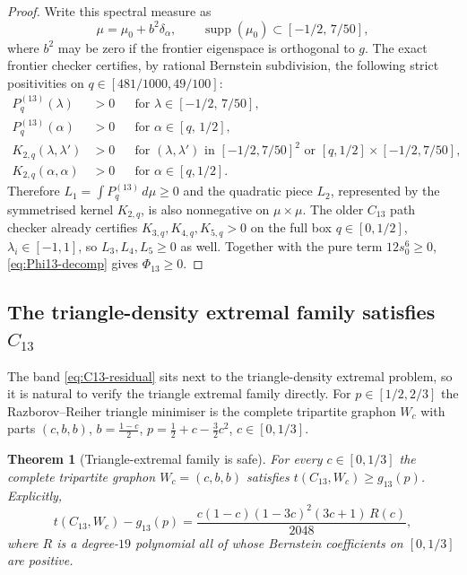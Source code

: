 \documentclass[11pt]{article}
\newtheorem{theorem}{Theorem}[section]
\begin{document}
\begin{proof}
Write this spectral measure as
\[
        \mu=\mu_0+b^2\delta_\alpha,
        \qquad \operatorname{supp}(\mu_0)\subset[-1/2,\,7/50],
\]
where $b^2$ may be zero if the frontier eigenspace is orthogonal to $g$.  The exact frontier checker certifies, by rational Bernstein subdivision, the following strict positivities on $q\in[481/1000,49/100]$:
\[
\begin{aligned}
        P_q^{(13)}(\lambda)&>0
            &&\text{for }\lambda\in[-1/2,\,7/50],\\
        P_q^{(13)}(\alpha)&>0
            &&\text{for }\alpha\in[q,\,1/2],\\
        K_{2,q}(\lambda,\lambda')&>0
            &&\text{for }(\lambda,\lambda')\text{ in }[-1/2,7/50]^2
              \text{ or }[q,1/2]\times[-1/2,7/50],\\
        K_{2,q}(\alpha,\alpha)&>0
            &&\text{for }\alpha\in[q,1/2].
\end{aligned}
\]
Therefore $L_1=\int P_q^{(13)}\,d\mu\ge0$ and the quadratic piece $L_2$, represented by the symmetrised kernel $K_{2,q}$, is also nonnegative on $\mu\times\mu$.  The older $C_{13}$ path checker already certifies $K_{3,q},K_{4,q},K_{5,q}>0$ on the full box $q\in[0,1/2]$, $\lambda_i\in[-1,1]$, so $L_3,L_4,L_5\ge0$ as well.  Together with the pure term $12s_0^6\ge0$, \eqref{eq:Phi13-decomp} gives $\Phi_{13}\ge0$.
\end{proof}

\subsection{The triangle-density extremal family satisfies $C_{13}$}\label{subsec:C13-tripartite}

The band \eqref{eq:C13-residual} sits next to the triangle-density extremal problem, so it is natural to verify the triangle extremal family directly.  For $p\in[1/2,2/3]$ the Razborov--Reiher triangle minimiser is the complete tripartite graphon $W_c$ with parts $(c,b,b)$, $b=\tfrac{1-c}2$, $p=\tfrac12+c-\tfrac32c^2$, $c\in[0,1/3]$.

\begin{theorem}[Triangle-extremal family is safe]\label{thm:C13-tripartite}
For every $c\in[0,1/3]$ the complete tripartite graphon $W_c=(c,b,b)$ satisfies $t(C_{13},W_c)\ge g_{13}(p)$.  Explicitly,
\[
        t(C_{13},W_c)-g_{13}(p)=\frac{c(1-c)(1-3c)^2(3c+1)\,R(c)}{2048},
\]
where $R$ is a degree-$19$ polynomial all of whose Bernstein coefficients on $[0,1/3]$ are positive.
\end{theorem}
\end{document}
